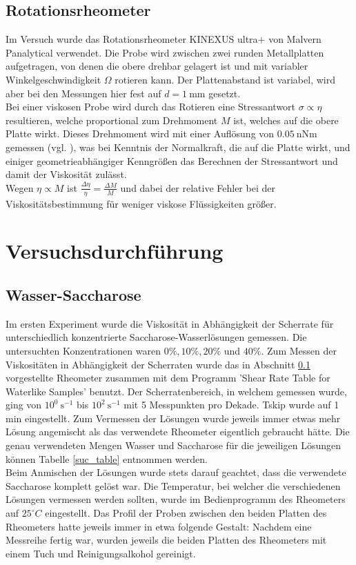 \documentclass[11pt,a4paper,oneside]{scrartcl}
\begin{document}
\subsection{Rotationsrheometer}\label{rheometer}
Im Versuch wurde das Rotationsrheometer KINEXUS ultra+ von Malvern Panalytical verwendet. Die Probe wird zwischen zwei runden Metallplatten aufgetragen, von denen die obere drehbar gelagert ist und mit variabler Winkelgeschwindigkeit $\Omega$ rotieren kann. Der Plattenabstand ist variabel, wird aber bei den Messungen hier fest auf $d=1\ \mathrm{mm}$ gesetzt. \\
Bei einer viskosen Probe wird durch das Rotieren eine Stressantwort $\sigma\propto\eta$ resultieren, welche proportional zum Drehmoment $M$ ist, welches auf die obere Platte wirkt. Dieses Drehmoment wird mit einer Auflösung von $0.05\ \mathrm{nNm}$ gemessen (vgl. \cite{malvern_2017}), was bei Kenntnis der Normalkraft, die auf die Platte wirkt, und einiger geometrieabhängiger Kenngrößen das Berechnen der Stressantwort und damit der Viskosität zulässt.\\
Wegen $\eta\propto M$ ist $\frac{\Delta\eta}{\eta}=\frac{\Delta M}{M}$ und dabei der relative Fehler bei der Viskositätsbestimmung für weniger viskose Flüssigkeiten größer.
\section{Versuchsdurchführung}
\subsection{Wasser-Saccharose}\label{H2O-Suc_Anmischen}
Im ersten Experiment wurde die Viskosität in Abhängigkeit der Scherrate für unterschiedlich konzentrierte Saccharose-Wasserlösungen gemessen. Die untersuchten Konzentrationen waren $0\%, 10\%, 20\%$ und  $40\%$. Zum Messen der
Viskositäten in Abhängigkeit der Scherraten wurde das in Abschnitt \ref{rheometer} vorgestellte Rheometer zusammen mit dem Programm 'Shear Rate Table for Waterlike Samples' benutzt. Der Scherratenbereich,
in welchem gemessen wurde, ging von $10^0\ \mathrm s^{-1}$ bis $10^2\ \mathrm s^{-1}$ mit 5 Messpunkten pro Dekade. Tskip wurde auf 1 min eingestellt. Zum Vermessen der Lösungen wurde jeweils immer etwas mehr Lösung angemischt als das
verwendete Rheometer eigentlich gebraucht hätte. Die genau verwendeten Mengen Wasser und Saccharose für die jeweiligen Lösungen können Tabelle \ref{suc_table} entnommen werden. \\
Beim Anmischen der Lösungen wurde stets darauf geachtet, dass die
verwendete Saccharose komplett gelöst war. Die Temperatur, bei welcher die verschiedenen Lösungen vermessen werden sollten, wurde im Bedienprogramm des Rheometers auf $25^{\circ}C$ eingestellt. Das Profil der Proben
zwischen den beiden Platten des Rheometers hatte jeweils immer in etwa folgende Gestalt:
Nachdem eine Messreihe fertig war, wurden jeweils die beiden Platten des
Rheometers mit einem Tuch und Reinigungsalkohol gereinigt.
\end{document}
